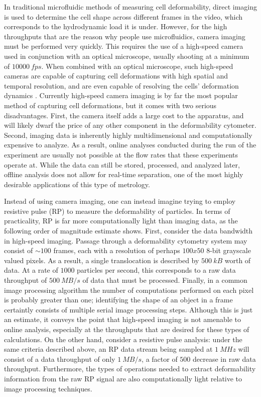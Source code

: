		In traditional microfluidic methods of measuring cell deformability, direct imaging is used to determine the cell shape across different frames in the video, which corresponds to the hydrodynamic load it is under. However, for the high throughputs that are the reason why people use microfluidics, camera imaging must be performed very quickly. This requires the use of a high-speed camera used in conjunction with an optical microscope, usually shooting at a minimum of $\SI{10000}{fps}$. When combined with an optical microscope, such high-speed cameras are capable of capturing cell deformations with high spatial and temporal resolution, and are even capable of resolving the cells' deformation dynamics \cite{DiCarlo2017}. Currently high-speed camera imaging is by far the most popular method of capturing cell deformations, but it comes with two serious disadvantages. First, the camera itself adds a large cost to the apparatus, and will likely dwarf the price of any other component in the deformability cytometer. Second, imaging data is inherently highly multidimensional and computationally expensive to analyze. As a result, online analyses conducted during the run of the experiment are usually not possible at the flow rates that these experiments operate at. While the data can still be stored, processed, and analyzed later, offline analysis does not allow for real-time separation, one of the most highly desirable applications of this type of metrology.
		
		Instead of using camera imaging, one can instead imagine trying to employ resistive pulse (RP) to measure the deformability of particles. In terms of practicality, RP is far more computationally light than imaging data, as the following order of magnitude estimate shows. First, consider the data bandwidth in high-speed imaging. Passage through a deformability cytometry system may consist of $\sim100$ frames, each with a resolution of perhaps $100x50$ 8-bit grayscale valued pixels. As a result, a single translocation is described by $\SI{500}{kB}$ worth of data. At a rate of $1000$ particles per second, this corresponds to a raw data throughput of $\SI{500}{MB/s}$ of data that must be processed. Finally, in a common image processing algorithm the number of computations performed on each pixel is probably greater than one; identifying the shape of an object in a frame certaintly consists of multiple serial image processing steps. Although this is just an estimate, it conveys the point that high-speed imaging is not amenable to online analysis, especially at the throughputs that are desired for these types of calculations. On the other hand, consider a resistive pulse analysis: under the same criteria described above, an RP data stream being sampled at $\SI{1}{MHz}$ will consist of a data throughput of only $\SI{1}{MB/s}$, a factor of $500$ decrease in raw data throughput. Furthermore, the types of operations needed to extract deformability information from the raw RP signal are also computationally light relative to image processing techniques.
		
